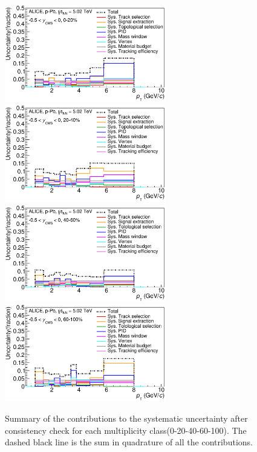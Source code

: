 \begin{figure}[htbp]
\begin{center}
\includegraphics[width=7.0cm]{./Version1/FigChapter5/Systematic/SysTotalFinal020.eps}
\hspace{0.5cm}
\includegraphics[width=7.0cm]{./Version1/FigChapter5/Systematic/SysTotalFinal2040.eps}
\hspace{0.5cm}
\includegraphics[width=7.0cm]{./Version1/FigChapter5/Systematic/SysTotalFinal4060.eps}
\hspace{0.5cm}
\includegraphics[width=7.0cm]{./Version1/FigChapter5/Systematic/SysTotalFinal60100.eps}
\caption{Summary of the contributions to the systematic uncertainty after consistency check for each multiplicity class(0-20-40-60-100). The dashed black line is the sum in quadrature of all the contributions.} 
 \label{fig:syserrortotCent}
\end{center}
\end{figure}

